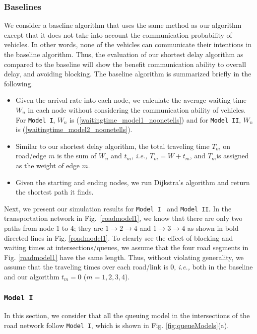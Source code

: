 \documentclass[conference]{IEEEtran}
\newcommand{\ie}{{\em i.e., }}
\newcommand{\modelI}{{\tt{Model I}}}
\newcommand{\modelII}{{\tt{Model II}}}
\begin{document}
\subsubsection{Baselines}
We consider a baseline algorithm that uses the same method as our algorithm except that it does not take into account the communication probability of vehicles. In other words, none of the vehicles can communicate their intentions in the baseline algorithm. Thus, the evaluation of our shortest delay algorithm as compared to the baseline will show the benefit communication ability to overall delay, and avoiding blocking. The baseline algorithm is summarized briefly in the following.
\begin{itemize}
\item Given the arrival rate into each node, we calculate the average waiting time $W_n$ in each node without considering the communication ability of vehicles. For \modelI, $W_n$ is (\ref{waitingtime_model1_noonetells}) and for \modelII, $W_n$ is (\ref{waitingtime_model2_noonetells}).
\item Similar to our shortest delay algorithm, the total traveling time $T_m$ on road/edge $m$ is the sum of $W_n$ and $t_m$, \ie $T_m=W+t_m$, and $T_m $is assigned as the weight of edge $m$.
\item Given the starting and ending nodes, we run Dijkstra's algorithm and return the shortest path it finds.
\end{itemize}

Next, we present our simulation results for \modelI~ and  \modelII. In the transportation network in Fig.~\ref{roadmodel1}, we know that there are only two paths from node 1 to 4; they are $1\to 2\to 4$ and $1\to 3\to 4$ as shown in bold directed lines in Fig. \ref{roadmodel1}. To clearly see the effect of blocking and waiting times at intersections/queues, we assume that the four road segments in Fig. \ref{roadmodel1} have the same length. Thus, without violating generality, we assume that the traveling times over each road/link is 0, \ie both in the baseline and our algorithm $t_m=0$ ($m=1,2,3,4$).

\subsubsection{\modelI}
In this section, we consider that all the queuing model in the intersections of the road network follow \modelI, which is shown in Fig. \ref{fig:queueModels}(a).
\end{document}
